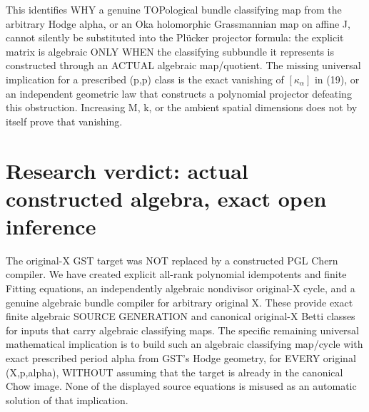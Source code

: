 \documentclass[11pt]{article}
\begin{document}
This identifies
WHY a genuine
TOPological bundle
classifying map
from the arbitrary
Hodge alpha,
or an Oka holomorphic
Grassmannian map
on affine J,
cannot silently be
substituted into
the Pl\"ucker
projector formula:
the explicit
matrix is algebraic
ONLY WHEN the
classifying subbundle
it represents is
constructed through
an ACTUAL algebraic
map/quotient.
The missing
universal implication
for a prescribed
(p,p) class is
the exact vanishing
of $[\kappa_\alpha]$
in (19), or an
independent geometric
law that constructs
a polynomial
projector defeating
this obstruction.
Increasing M,
k, or the ambient
spatial dimensions
does not by itself
prove that vanishing.

\section{Research verdict: actual constructed algebra, exact open inference}
The original-X GST target was
NOT replaced by a constructed
PGL Chern compiler. We have
created explicit
all-rank polynomial idempotents
and finite Fitting equations,
an independently algebraic
nondivisor original-X cycle,
and a genuine algebraic
bundle compiler for
arbitrary original X.
These provide exact
finite algebraic
SOURCE GENERATION and
canonical original-X
Betti classes for inputs
that carry algebraic
classifying maps.
The specific remaining
universal mathematical
implication is to build
such an algebraic
classifying map/cycle
with exact prescribed
period alpha from
GST's Hodge geometry,
for EVERY original
(X,p,alpha), WITHOUT
assuming that the
target is already in
the canonical Chow
image. None of the
displayed source
equations is misused
as an automatic
solution of that
implication.
\end{document}
